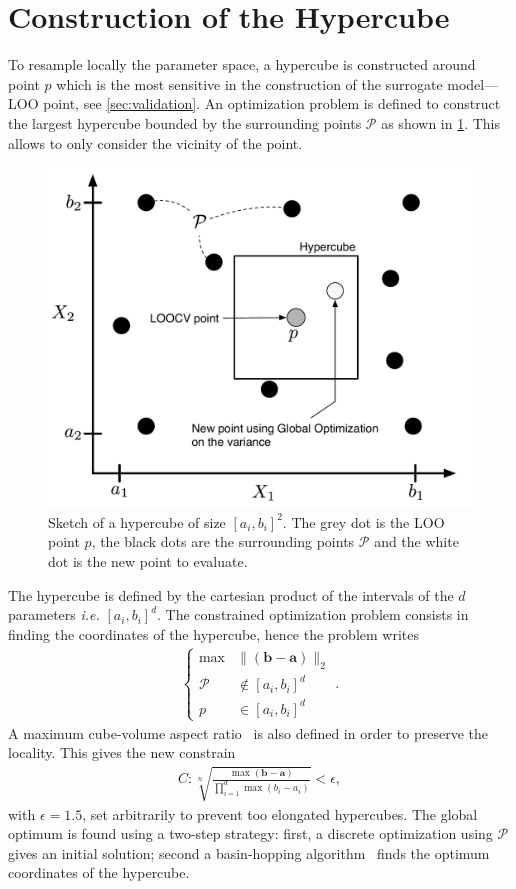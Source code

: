 \section{Construction of the Hypercube}
\label{sec:hypercube}

To resample locally the parameter space, a hypercube is constructed around point $p$ which is the most sensitive in the construction of the surrogate model---LOO point, see \cref{sec:validation}. An optimization problem is defined to construct the largest hypercube bounded by the surrounding points $\mathcal{P}$ as shown in \cref{fig:hypercube}. This allows to only consider the vicinity of the point.

\begin{figure}[ht]
\centering
\includegraphics[width=0.8\linewidth,keepaspectratio]{fig/contributions/resample/2_1column_color-online-only_hypercube.pdf}
\caption{Sketch of a hypercube of size $[a_i, b_i]^2$. The grey dot is the LOO point $p$, the black dots are the surrounding points $\mathcal{P}$ and the white dot is the new point to evaluate.}
\label{fig:hypercube}
\end{figure}

The hypercube is defined by the cartesian product of the intervals of the ${d}$ parameters \textit{i.e.} $[a_i, b_i]^{d}$. The constrained optimization problem consists in finding the coordinates of the hypercube, hence the problem writes
\begin{align}
\left\{\begin{array}{rc} \max  &\parallel (\mathbf{b} - \mathbf{a}) \parallel_{2} \\\mathcal{P} &\notin [a_i, b_i]^{d} \\ p &\in [a_i, b_i]^{d} \end{array}\right. .
\end{align}
A maximum cube-volume aspect ratio~\cite{smith1998} is also defined in order to preserve the locality. This gives the new constrain
\begin{align}
C : \sqrt[n]{\frac{\max (\mathbf{b} - \mathbf{a})}{\displaystyle\prod_{i = 1}^{d} \max (b_i - a_i)}} < \epsilon ,
\end{align}
with $\epsilon = 1.5$, set arbitrarily to prevent too elongated hypercubes. The global optimum is found using a two-step strategy: first, a discrete optimization using $\mathcal{P}$ gives an initial solution; second a basin-hopping algorithm~\cite{wales1997} finds the optimum coordinates of the hypercube.


